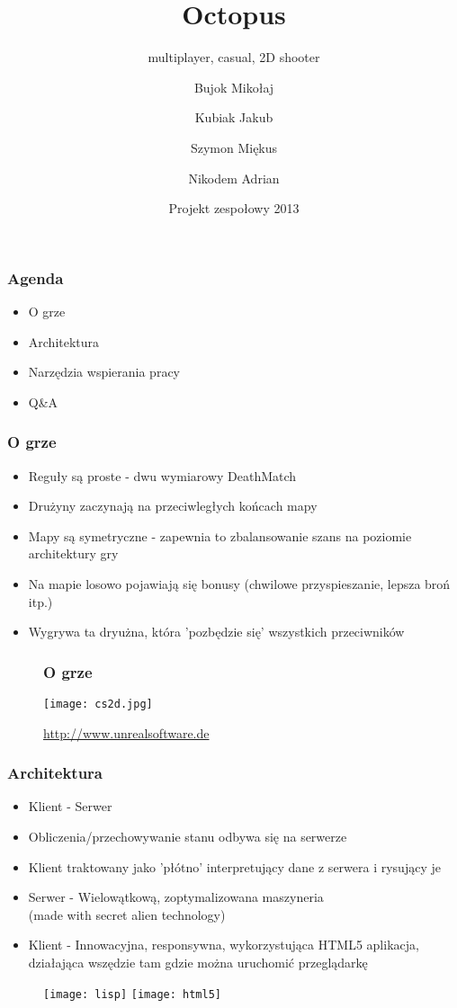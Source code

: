 \documentclass{beamer}
\title
{Octopus}
\subtitle{multiplayer, casual, 2D shooter}
\author[]
{Bujok Mikołaj \and Kubiak Jakub \\ \and Szymon Miękus\and Nikodem Adrian}
\date[\today]
{Projekt zespołowy 2013}
\begin{document}
\frame{\titlepage}
\begin{frame}
  \frametitle{Agenda}
  \begin{itemize}
  \item O grze
  \item Architektura
  \item Narzędzia wspierania pracy
  \item Q\&A
  \end{itemize}
\end{frame}

\begin{frame}
  \frametitle{O grze}
  \begin{itemize}
    \item Reguły są proste - dwu wymiarowy DeathMatch
    \item Drużyny zaczynają na przeciwległych końcach mapy
    \item Mapy są symetryczne - zapewnia to zbalansowanie
          szans na poziomie architektury gry
    \item Na mapie losowo pojawiają się bonusy (chwilowe przyspieszanie, lepsza broń itp.)
    \item Wygrywa ta dryużna, która 'pozbędzie się' wszystkich przeciwników
  \end{itemize}
\end{frame}

\begin{frame}
\begin{figure}[ht]
\frametitle{O grze}
\texttt{[image: cs2d.jpg]}
\label{cs2d}
\caption{\href{http://www.unrealsoftware.de}{http://www.unrealsoftware.de}}
\end{figure}
\end{frame}
\begin{frame}

\frametitle{Architektura}
\begin{itemize}
\item Klient - Serwer
\item Obliczenia/przechowywanie stanu odbywa się na serwerze
\item Klient traktowany jako 'płótno' interpretujący dane z serwera i rysujący je
\item Serwer - Wielowątkową, zoptymalizowana maszyneria \\
 (made with secret alien technology)
\item Klient - Innowacyjna, responsywna, wykorzystująca HTML5 aplikacja, działająca wszędzie
tam gdzie można uruchomić przeglądarkę
\end{itemize}

\begin{figure}
   \centering
      \texttt{[image: lisp]}
      \texttt{[image: html5]}
\end{figure}
\end{frame}
\end{document}
